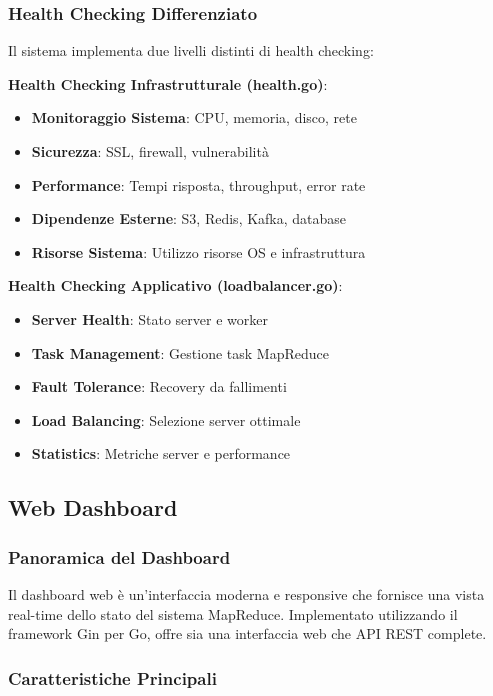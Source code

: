 \documentclass[12pt,a4paper]{article}
\begin{document}
\subsubsection{Health Checking Differenziato}

Il sistema implementa due livelli distinti di health checking:

\textbf{Health Checking Infrastrutturale (health.go)}:
\begin{itemize}
\item \textbf{Monitoraggio Sistema}: CPU, memoria, disco, rete
\item \textbf{Sicurezza}: SSL, firewall, vulnerabilità
\item \textbf{Performance}: Tempi risposta, throughput, error rate
\item \textbf{Dipendenze Esterne}: S3, Redis, Kafka, database
\item \textbf{Risorse Sistema}: Utilizzo risorse OS e infrastruttura
\end{itemize}

\textbf{Health Checking Applicativo (loadbalancer.go)}:
\begin{itemize}
\item \textbf{Server Health}: Stato server e worker
\item \textbf{Task Management}: Gestione task MapReduce
\item \textbf{Fault Tolerance}: Recovery da fallimenti
\item \textbf{Load Balancing}: Selezione server ottimale
\item \textbf{Statistics}: Metriche server e performance
\end{itemize}

\subsection{Web Dashboard}

\subsubsection{Panoramica del Dashboard}

Il dashboard web è un'interfaccia moderna e responsive che fornisce una vista real-time dello stato del sistema MapReduce. Implementato utilizzando il framework Gin per Go, offre sia una interfaccia web che API REST complete.

\subsubsection{Caratteristiche Principali}
\end{document}
